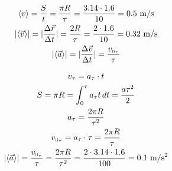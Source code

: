 \documentclass[a5paper,10pt]{article}
\newcommand{\average}[1]{\langle{#1}\rangle}
\newcommand{\RN}[1]{%
  \textup{\tiny\uppercase\expandafter{\romannumeral#1}}%
}
\begin{document}
\begin{gather*}
	\average{v}=\frac{{S}}{{t}}=\frac{\pi{R}}{\tau}=
	\frac{3.14\cdot{1.6}}{10}=0.5\text{ m/s}\\
	|\average{\vec{v}}|=|\frac{\Delta{\vec{r}}}{\Delta{t}}|=\frac{2R}{\tau}=
	\frac{2\cdot{1.6}}{10}=0.32\text{ m/s}\\
	|\average{\vec{a}}|=|\frac{\Delta{\vec{v}}}{\Delta{t}}|=\frac{v_{\RN{2}_\tau}}{\tau}
\end{gather*}

\begin{gather*}
	v_\tau=a_\tau\cdot{t}\\
	S=\pi{R}=\int_0^\tau a_\tau{t}\,dt=\frac{a\tau^2}{2}\\
	a_\tau=\frac{2\pi{R}}{\tau^2}\\
	v_{\RN{2}_\tau}=a_\tau\cdot{\tau}=\frac{2\pi{R}}{\tau}\\
	|\average{\vec{a}}|=\frac{v_{\RN{2}_\tau}}{\tau}=\frac{2\pi{R}}{\tau^2}=
	\frac{2\cdot{}3.14\cdot{1.6}}{100}=0.1\text{ m/s$^2$}\\
\end{gather*}
\end{document}
